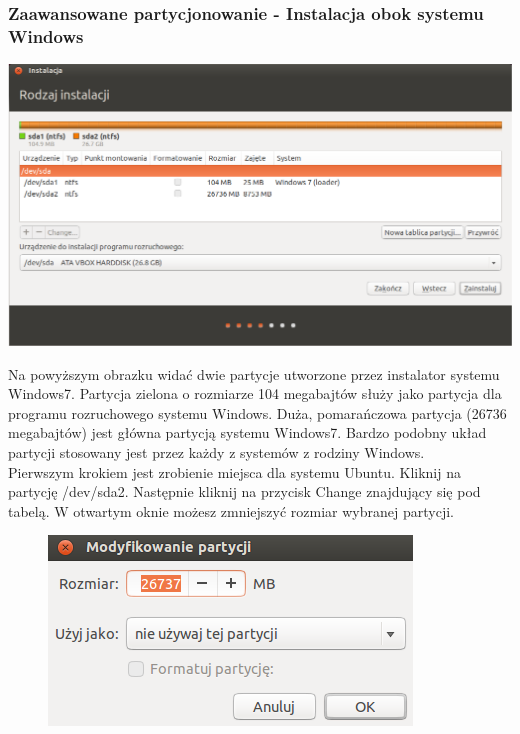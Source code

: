 \subsubsection{Zaawansowane partycjonowanie - Instalacja obok systemu Windows}
\begin{center}
        \includegraphics[width=\linewidth]{images/instalator_partycjonowanie_gparted2_czysty.png}
\end{center}

Na powyższym obrazku widać dwie partycje utworzone przez instalator systemu Windows7. Partycja zielona o rozmiarze 104 megabajtów służy jako partycja dla programu rozruchowego systemu Windows. Duża, pomarańczowa partycja (26736 megabajtów) jest główna partycją systemu Windows7. Bardzo podobny układ partycji stosowany jest przez każdy z systemów z rodziny Windows.\\
Pierwszym krokiem jest zrobienie miejsca dla systemu Ubuntu. Kliknij na partycję \textcolor{ubuntu_orange}{/dev/sda2}. Następnie kliknij na przycisk \textcolor{ubuntu_orange}{Change} znajdujący się pod tabelą. W otwartym oknie możesz zmniejszyć rozmiar wybranej partycji.
\clearpage
\begin{figure}
                \includegraphics[width=\linewidth]{images/instalator_partycjonowanie_gparted_zmniejszenie_partycji_windows.png}
\end{figure}

